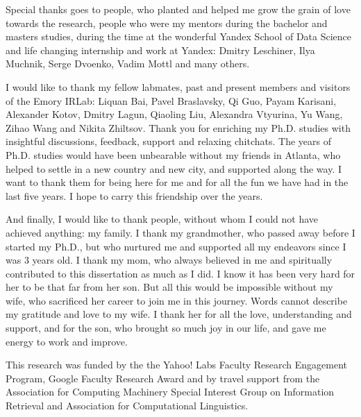 {Special thanks goes to people, who planted and helped me grow the grain of love towards the research, people who were my mentors during the bachelor and masters studies, during the time at the wonderful Yandex School of Data Science and life changing internship and work at Yandex: Dmitry Leschiner, Ilya Muchnik, Serge Dvoenko, Vadim Mottl and many others.

I would like to thank my fellow labmates, past and present members and visitors of the Emory IRLab: Liquan Bai, Pavel Braslavsky, Qi Guo, Payam Karisani, Alexander Kotov, Dmitry Lagun, Qiaoling Liu, Alexandra Vtyurina, Yu Wang, Zihao Wang and Nikita Zhiltsov.
Thank you for enriching my Ph.D. studies with insightful discussions, feedback, support and relaxing chitchats.
The years of Ph.D. studies would have been unbearable without my friends in Atlanta, who helped to settle in a new country and new city, and supported along the way.
I want to thank them for being here for me and for all the fun we have had in the last five years.
I hope to carry this friendship over the years.

And finally, I would like to thank people, without whom I could not have achieved anything: my family.
I thank my grandmother, who passed away before I started my Ph.D., but who nurtured me and supported all my endeavors since I was 3 years old.
I thank my mom, who always believed in me and spiritually contributed to this dissertation as much as I did.
I know it has been very hard for her to be that far from her son.
But all this would be impossible without my wife, who sacrificed her career to join me in this journey.
Words cannot describe my gratitude and love to my wife.
I thank her for all the love, understanding and support, and for the son, who brought so much joy in our life, and gave me energy to work and improve.

This research was funded by the the Yahoo! Labs Faculty Research Engagement Program, Google Faculty Research Award and by travel support
from the Association for Computing Machinery Special Interest Group on Information Retrieval and Association for Computational Linguistics.
}

